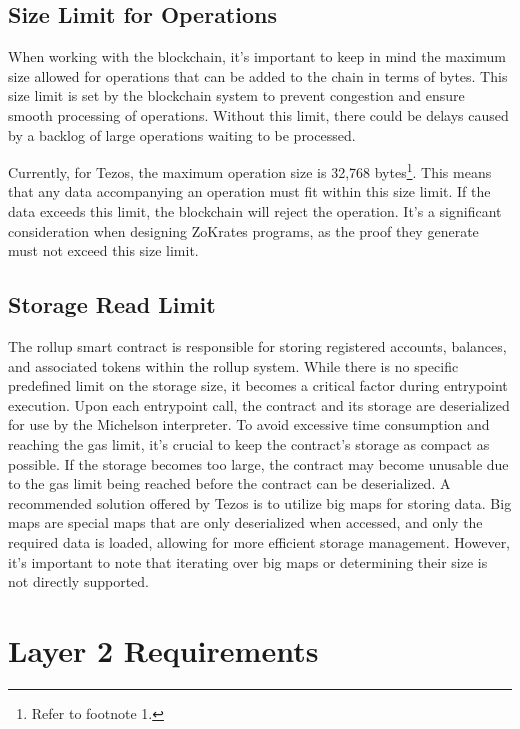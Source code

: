 \subsection{Size Limit for Operations}

When working with the blockchain, it's important to keep in mind the maximum size allowed for operations that can be added to the chain in terms of bytes. This size limit is set by the blockchain system to prevent congestion and ensure smooth processing of operations. Without this limit, there could be delays caused by a backlog of large operations waiting to be processed.

Currently, for Tezos, the maximum operation size is 32,768 bytes\footnote{Refer to footnote 1.}. This means that any data accompanying an operation must fit within this size limit. If the data exceeds this limit, the blockchain will reject the operation. It's a significant consideration when designing ZoKrates programs, as the proof they generate must not exceed this size limit.

\subsection{Storage Read Limit}

The rollup smart contract is responsible for storing registered accounts, balances, and associated tokens within the rollup system. While there is no specific predefined limit on the storage size, it becomes a critical factor during entrypoint execution. Upon each entrypoint call, the contract and its storage are deserialized for use by the Michelson interpreter. To avoid excessive time consumption and reaching the gas limit, it's crucial to keep the contract's storage as compact as possible. If the storage becomes too large, the contract may become unusable due to the gas limit being reached before the contract can be deserialized. A recommended solution offered by Tezos is to utilize big maps for storing data. Big maps are special maps that are only deserialized when accessed, and only the required data is loaded, allowing for more efficient storage management. However, it's important to note that iterating over big maps or determining their size is not directly supported.

\section{Layer 2 Requirements}

